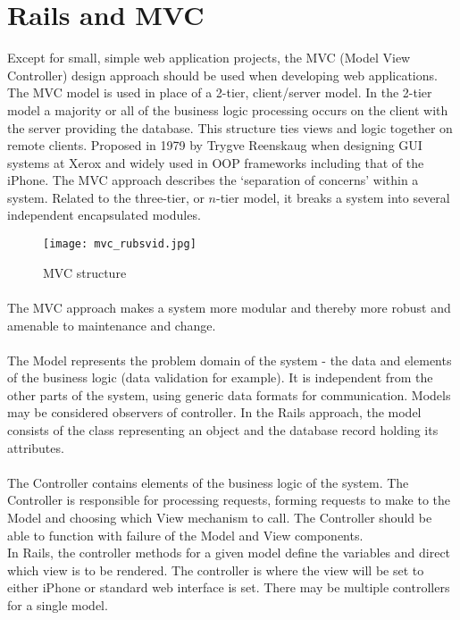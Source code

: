 \documentclass[letterpaper]{amsart}
\begin{document}
\section{Rails and MVC}
Except for small, simple web application projects, the MVC (Model View Controller) design approach should be used when developing web applications.\cite{tomcat}  The MVC model is used in place of a 2-tier, client/server model.  In the 2-tier model a majority or all of the business logic processing occurs on the client with the server providing the database.  This structure ties views and logic together on remote clients.  
Proposed in 1979 by Trygve Reenskaug when designing GUI systems at Xerox and widely used in OOP frameworks including that of the iPhone\cite{iphoneaction}. The MVC approach describes the `separation of concerns' within a system.  Related to the three-tier, or $n$-tier model, it breaks a system into several independent encapsulated modules\cite{rubesvid}.
\begin{figure}[]
    \centering
   \texttt{[image: mvc\_rubsvid.jpg]}
    \caption{MVC structure}
\end{figure}

\paragraph{ }The MVC approach makes a system more modular and thereby more robust and amenable to maintenance and change.\cite{turborapid}
\\
\paragraph{ }The Model represents the problem domain of the system - the data and elements of the business logic (data validation for example)\cite{ibmsphere}. It is independent from the other parts of the system, using generic data formats for communication. Models may be considered observers of controller.  In the Rails approach, the model consists of the class representing an object and the database record holding its attributes. 
\paragraph{ }The Controller contains elements of the business logic of the system. The Controller is responsible for processing requests, forming requests to make to the Model and choosing which View mechanism to call. The Controller should be able to function with failure of the Model and View components\cite{ibmsphere}.\\ In Rails, the controller methods for a given model define the variables and direct which view is to be rendered.  The controller is where the view will be set to either iPhone or standard web interface is set. There may be multiple controllers for a single model.\\ 
\end{document}
